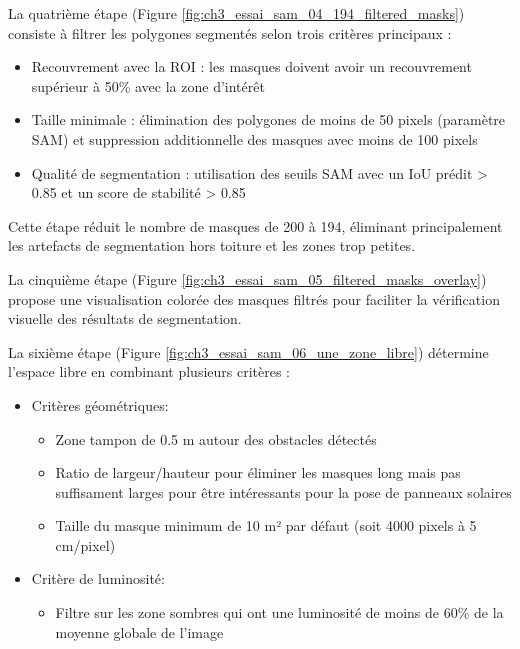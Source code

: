 La quatrième étape (Figure \ref{fig:ch3_essai_sam_04_194_filtered_masks}) consiste à filtrer les polygones segmentés selon trois critères principaux :
\begin{itemize}
    \item Recouvrement avec la ROI : les masques doivent avoir un recouvrement supérieur à 50\% avec la zone d'intérêt
    \item Taille minimale : élimination des polygones de moins de 50 pixels (paramètre SAM) et suppression additionnelle des masques avec moins de 100 pixels
    \item Qualité de segmentation : utilisation des seuils SAM avec un IoU prédit > 0.85 et un score de stabilité > 0.85
\end{itemize}
Cette étape réduit le nombre de masques de 200 à 194, éliminant principalement les artefacts de segmentation hors toiture et les zones trop petites.

La cinquième étape (Figure \ref{fig:ch3_essai_sam_05_filtered_masks_overlay}) propose une visualisation colorée des masques filtrés pour faciliter la vérification visuelle des résultats de segmentation.

La sixième étape (Figure \ref{fig:ch3_essai_sam_06_une_zone_libre}) détermine l'espace libre en combinant plusieurs critères :

\begin{itemize}
    \item Critères géométriques:
    \begin{itemize}
        \item Zone tampon de 0.5 m autour des obstacles détectés
        \item Ratio de largeur/hauteur pour éliminer les masques long mais pas suffisament larges pour être intéressants pour la pose de panneaux solaires
        \item Taille du masque minimum de 10 m² par défaut (soit 4000 pixels à 5 cm/pixel)
    \end{itemize}
    \item Critère de luminosité:
        \begin{itemize}
            \item Filtre sur les zone sombres qui ont une luminosité de moins de 60\% de la moyenne globale de l'image
        \end{itemize}
\end{itemize}

